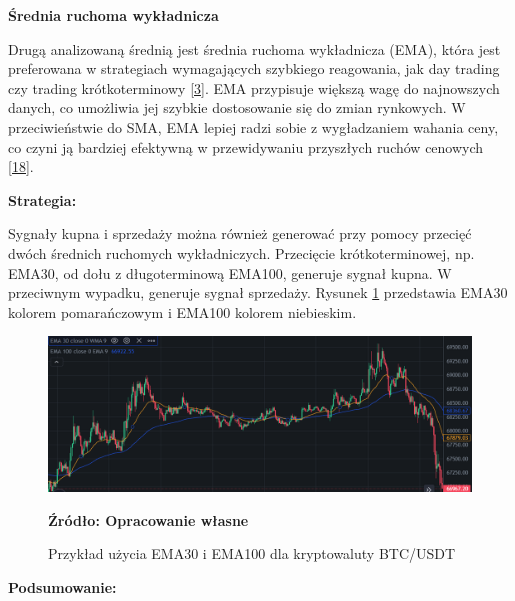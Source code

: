 \documentclass[12pt,a4paper,twoside, inzynierska]{pwr_wmat_praca_dyplomowa}
\theoremstyle{plain}
\numberwithin{theorem}{chapter}
\theoremstyle{definition}
\numberwithin{theorem}{chapter}
\begin{document}
		
	\noindent \textbf{Średnia ruchoma wykładnicza}

	Drugą analizowaną średnią jest średnia ruchoma wykładnicza (EMA), która jest preferowana w strategiach wymagających szybkiego reagowania, jak day trading czy trading krótkoterminowy \hyperref[info3]{[3]}. EMA przypisuje większą wagę do najnowszych danych, co umożliwia jej szybkie dostosowanie się do zmian rynkowych. W przeciwieństwie do SMA, EMA lepiej radzi sobie z wygładzaniem wahania ceny, co czyni ją bardziej efektywną w przewidywaniu przyszłych ruchów cenowych \hyperref[info18]{[18]}. \newline

	\noindent \textbf{Strategia:}

	Sygnały kupna i sprzedaży można również generować przy pomocy przecięć dwóch średnich ruchomych wykładniczych. Przecięcie krótkoterminowej, np. EMA30, od dołu z długoterminową EMA100, generuje sygnał kupna. W przeciwnym wypadku, generuje sygnał sprzedaży. Rysunek \ref{fig:EMA30i100} przedstawia EMA30 kolorem pomarańczowym i EMA100 kolorem niebieskim.

	\begin{figure}[H]
		\centering
		\includegraphics[width=1\textwidth]{EMA30i100.png}
		\caption{Przykład użycia EMA30 i EMA100 dla kryptowaluty BTC/USDT}
		\label{fig:EMA30i100}
		\textbf{Źródło: Opracowanie własne}
	\end{figure}
	\vspace{12pt}

		
	\noindent \textbf{Podsumowanie:}
	
\end{document}
